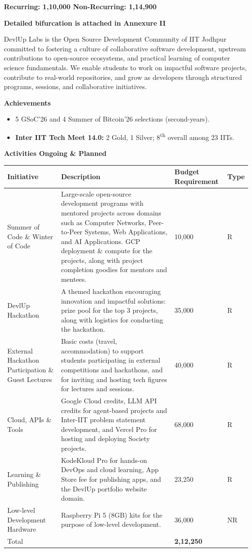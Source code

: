\documentclass[11pt,letterpaper]{article}
\newcommand{\rs}{{\rupee}}
\newcommand{\society}[1]{\par\bigskip{\sffamily\bfseries\large #1}\par}
\newcommand{\subhead}[1]{\par{\bfseries #1}\par}
\begin{document}
\textbf{Recurring: \rs1,10,000 \quad Non-Recurring: \rs1,14,900}

\textbf{Detailed bifurcation is attached in Annexure II}

\clearpage
\society{3.\ \ DevlUp Labs}

DevlUp Labs is the Open Source Development Community of IIT Jodhpur committed to fostering a culture of collaborative software development, upstream contributions to open-source ecosystems, and practical learning of computer science fundamentals. We enable students to work on impactful software projects, contribute to real-world repositories, and grow as developers through structured programs, sessions, and collaborative initiatives.

\subhead{Achievements}
\begin{itemize}
  \item 5 GSoC'26 and 4 Summer of Bitcoin'26 selections (second-years).
  \item \textbf{Inter IIT Tech Meet 14.0:} 2 Gold, 1 Silver; 8\textsuperscript{th} overall among 23 IITs.
\end{itemize}

\subhead{Activities Ongoing \& Planned}
{\small
\begin{longtable}{|L{0.25\textwidth}|L{0.40\textwidth}|C{0.17\textwidth}|C{0.06\textwidth}|}
\hline
\textbf{Initiative} & \textbf{Description} & \textbf{Budget Requirement} & \textbf{Type}\\ \hline
Summer of Code \& Winter of Code & Large-scale open-source development programs with mentored projects across domains such as Computer Networks, Peer-to-Peer Systems, Web Applications, and AI Applications. GCP deployment \& compute for the projects, along with project completion goodies for mentors and mentees. & \rs10,000 & R\\ \hline
DevlUp Hackathon & A themed hackathon encouraging innovation and impactful solutions: prize pool for the top 3 projects, along with logistics for conducting the hackathon. & \rs35,000 & R\\ \hline
External Hackathon Participation \& Guest Lectures & Basic costs (travel, accommodation) to support students participating in external competitions and hackathons, and for inviting and hosting tech figures for lectures and sessions. & \rs40,000 & R\\ \hline
Cloud, APIs \& Tools & Google Cloud credits, LLM API credits for agent-based projects and Inter-IIT problem statement development, and Vercel Pro for hosting and deploying Society projects. & \rs68,000 & R\\ \hline
Learning \& Publishing & KodeKloud Pro for hands-on DevOps and cloud learning, App Store fee for publishing apps, and the DevlUp portfolio website domain. & \rs23,250 & R\\ \hline
Low-level Development Hardware & Raspberry Pi 5 (8GB) kits for the purpose of low-level development. & \rs36,000 & NR\\ \hline
Total & & \textbf{\rs2,12,250} & \\ \hline
\end{longtable}}
\end{document}
